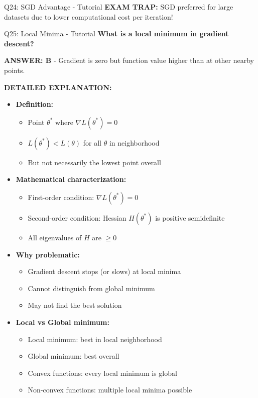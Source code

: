 \documentclass[8pt]{beamer}
\begin{document}
\begin{frame}{Q24: SGD Advantage - Tutorial}
		\textcolor{myred}{\textbf{EXAM TRAP:}} SGD preferred for large datasets due to \textcolor{myblue}{lower computational cost per iteration}!
	\end{frame}
	
	\begin{frame}{Q25: Local Minima - Tutorial}
		\fontsize{6.5}{7.5}\selectfont
		\textbf{What is a local minimum in gradient descent?}
		
		\vspace{0.05cm}
		\textcolor{myblue}{\textbf{ANSWER: B}} - Gradient is zero but function value higher than at other nearby points.
		
		\vspace{0.05cm}
		\textbf{DETAILED EXPLANATION:}
		\begin{itemize}
			\item \textbf{Definition:}
			\begin{itemize}
				\item Point $\theta^*$ where $\nabla L(\theta^*) = 0$
				\item $L(\theta^*) < L(\theta)$ for all $\theta$ in neighborhood
				\item But not necessarily the lowest point overall
			\end{itemize}
			\item \textbf{Mathematical characterization:}
			\begin{itemize}
				\item First-order condition: $\nabla L(\theta^*) = 0$
				\item Second-order condition: Hessian $H(\theta^*)$ is positive semidefinite
				\item All eigenvalues of $H$ are $\geq 0$
			\end{itemize}
			\item \textbf{Why problematic:}
			\begin{itemize}
				\item Gradient descent stops (or slows) at local minima
				\item Cannot distinguish from global minimum
				\item May not find the best solution
			\end{itemize}
			\item \textbf{Local vs Global minimum:}
			\begin{itemize}
				\item Local minimum: best in local neighborhood
				\item Global minimum: best overall
				\item Convex functions: every local minimum is global
				\item Non-convex functions: multiple local minima possible
			\end{itemize}
		\end{itemize}
		

\end{frame}
\end{document}
